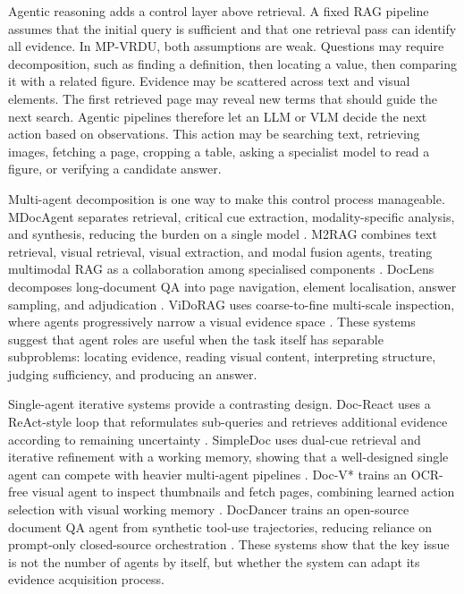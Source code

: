 \documentclass[10pt,a4paper]{article}
\begin{document}
Agentic reasoning adds a control layer above retrieval. A fixed RAG pipeline assumes that the initial query is sufficient and that one retrieval pass can identify all evidence. In MP-VRDU, both assumptions are weak. Questions may require decomposition, such as finding a definition, then locating a value, then comparing it with a related figure. Evidence may be scattered across text and visual elements. The first retrieved page may reveal new terms that should guide the next search. Agentic pipelines therefore let an LLM or VLM decide the next action based on observations. This action may be searching text, retrieving images, fetching a page, cropping a table, asking a specialist model to read a figure, or verifying a candidate answer.

Multi-agent decomposition is one way to make this control process manageable. MDocAgent separates retrieval, critical cue extraction, modality-specific analysis, and synthesis, reducing the burden on a single model \cite{han2025mdocagent}. M2RAG combines text retrieval, visual retrieval, visual extraction, and modal fusion agents, treating multimodal RAG as a collaboration among specialised components \cite{duan2025m2rag}. DocLens decomposes long-document QA into page navigation, element localisation, answer sampling, and adjudication \cite{zhu2025doclens}. ViDoRAG uses coarse-to-fine multi-scale inspection, where agents progressively narrow a visual evidence space \cite{wang2025vidorag}. These systems suggest that agent roles are useful when the task itself has separable subproblems: locating evidence, reading visual content, interpreting structure, judging sufficiency, and producing an answer.

Single-agent iterative systems provide a contrasting design. Doc-React uses a ReAct-style loop that reformulates sub-queries and retrieves additional evidence according to remaining uncertainty \cite{wu2025doc}. SimpleDoc uses dual-cue retrieval and iterative refinement with a working memory, showing that a well-designed single agent can compete with heavier multi-agent pipelines \cite{jain2025simpledoc}. Doc-V* trains an OCR-free visual agent to inspect thumbnails and fetch pages, combining learned action selection with visual working memory \cite{zheng2026doc}. DocDancer trains an open-source document QA agent from synthetic tool-use trajectories, reducing reliance on prompt-only closed-source orchestration \cite{zhang2026docdancer}. These systems show that the key issue is not the number of agents by itself, but whether the system can adapt its evidence acquisition process.
\end{document}
